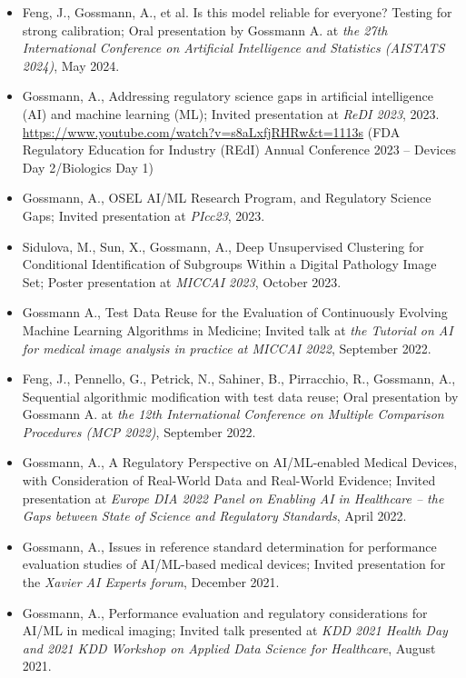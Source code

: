 \documentclass[overlapped, line, 10pt]{res} %
\begin{document}
\begin{resume}
\begin{itemize}
   \item Feng, J., Gossmann, A., et al. Is this model reliable for everyone? Testing for strong calibration;
    Oral presentation by Gossmann A. at \textit{the 27th International Conference on Artificial Intelligence and Statistics (AISTATS 2024)}, May 2024.
  \item Gossmann, A., Addressing regulatory science gaps in artificial intelligence (AI) and machine learning (ML);
    Invited presentation at \textit{ReDI 2023}, 2023. \url{https://www.youtube.com/watch?v=s8aLxfjRHRw&t=1113s} (FDA Regulatory Education for Industry (REdI) Annual Conference 2023 – Devices Day 2/Biologics Day 1)
  \item Gossmann, A., OSEL AI/ML Research Program, and Regulatory Science Gaps;
    Invited presentation at \textit{PIcc23}, 2023.
  \item Sidulova, M., Sun, X., Gossmann, A., Deep Unsupervised Clustering for Conditional Identification of Subgroups Within a Digital Pathology Image Set;
    Poster presentation at \textit{MICCAI 2023}, October 2023.
  \item Gossmann A., Test Data Reuse for the Evaluation of Continuously Evolving Machine Learning Algorithms in Medicine;
    Invited talk at \textit{the Tutorial on AI for medical image analysis in practice at MICCAI 2022}, September 2022.
  \item Feng, J., Pennello, G., Petrick, N., Sahiner, B., Pirracchio, R., Gossmann, A., Sequential algorithmic modification with test data reuse;
    Oral presentation by Gossmann A. at \textit{the 12th International Conference on Multiple Comparison Procedures (MCP 2022)}, September 2022.
  \item Gossmann, A., A Regulatory Perspective on AI/ML-enabled Medical Devices, with Consideration of Real-World Data and Real-World Evidence;
    Invited presentation at \textit{Europe DIA 2022 Panel on Enabling AI in Healthcare -- the Gaps between State of Science and Regulatory Standards}, April 2022.
  \item Gossmann, A., Issues in reference standard determination for performance evaluation studies of AI/ML-based medical devices;
    Invited presentation for the \textit{Xavier AI Experts forum}, December 2021.
  \item Gossmann, A., Performance evaluation and regulatory considerations for AI/ML in medical imaging;
    Invited talk presented at \textit{KDD 2021 Health Day and 2021 KDD Workshop on Applied Data Science for Healthcare}, August 2021.

\end{itemize}
\end{resume}
\end{document}
